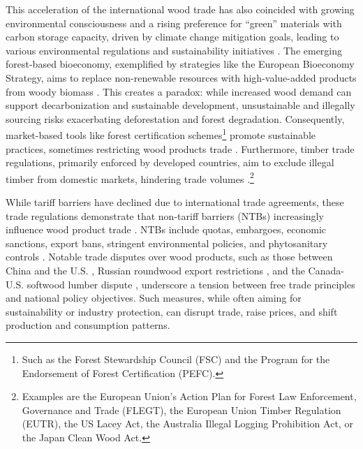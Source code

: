 \documentclass[
  authoryear,
  review,
  3p]{elsarticle}
\begin{document}
This acceleration of the international wood trade has also coincided
with growing environmental consciousness and a rising preference for
``green'' materials with carbon storage capacity, driven by climate
change mitigation goals, leading to various environmental regulations
and sustainability initiatives \citep{Prestemon2003}. The emerging
forest-based bioeconomy, exemplified by strategies like the European
Bioeconomy Strategy, aims to replace non-renewable resources with
high-value-added products from woody biomass
\citep{wolfslehner2016forest, winkel2017towards}. This creates a
paradox: while increased wood demand can support decarbonization and
sustainable development, unsustainable and illegally sourcing risks
exacerbating deforestation and forest degradation. Consequently,
market-based tools like forest certification schemes\footnote{Such as
  the Forest Stewardship Council (FSC) and the Program for the
  Endorsement of Forest Certification (PEFC).} promote sustainable
practices, sometimes restricting wood products trade
\citep{guan2019restricting, chen2020effect, boubacar2025sustainable}.
Furthermore, timber trade regulations, primarily enforced by developed
countries, aim to exclude illegal timber from domestic markets,
hindering trade volumes
\citep{moral2020transparency, rougieux2021impacts, apeti2023impact, kim2024analyzing}.\footnote{Examples
  are the European Union's Action Plan for Forest Law Enforcement,
  Governance and Trade (FLEGT), the European Union Timber Regulation
  (EUTR), the US Lacey Act, the Australia Illegal Logging Prohibition
  Act, or the Japan Clean Wood Act.}

While tariff barriers have declined due to international trade
agreements, these trade regulations demonstrate that non-tariff barriers
(NTBs) increasingly influence wood product trade \citep{2021unecefao}.
NTBs include quotas, embargoes, economic sanctions, export bans,
stringent environmental policies, and phytosanitary controls
\citep{li2007potential, sun2010impacts, buongiorno2018potential, 2022unecefao, 2024fao}.
Notable trade disputes over wood products, such as those between China
and the U.S. \citep{muhammad2021end, pan2021impacts}, Russian roundwood
export restrictions
\citep{turner2008implications, solberg2010forest, lin2017incidence, guan2024impact},
and the Canada-U.S. softwood lumber dispute
\citep{van2014global, johnston2017impact}, underscore a tension between
free trade principles and national policy objectives. Such measures,
while often aiming for sustainability or industry protection, can
disrupt trade, raise prices, and shift production and consumption
patterns.
\end{document}
